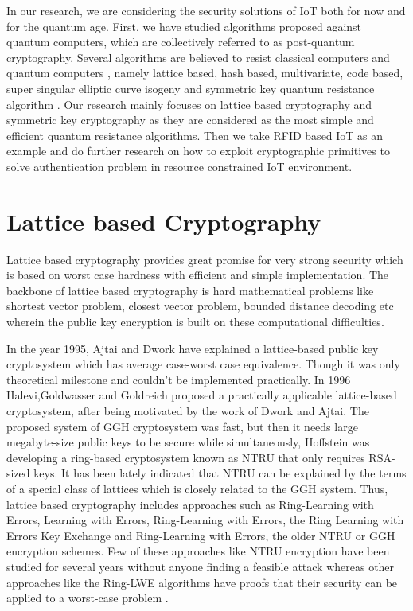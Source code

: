 \documentclass[preprint,10pt,5p]{elsarticle}
\begin{document}
In our research, we are considering the security solutions of IoT both for now and for the quantum age. First, we have studied algorithms proposed against quantum computers, which are collectively referred to as post-quantum cryptography. Several algorithms are believed to resist classical computers and quantum computers \cite{bernstein2009}, namely lattice based, hash based, multivariate, code based, super singular elliptic curve isogeny and symmetric key quantum resistance algorithm \cite{gabriel2013}. Our research mainly focuses on lattice based cryptography and symmetric key cryptography as they are considered as the most simple and efficient quantum resistance algorithms. Then we take RFID based IoT as an example and do further research on how to exploit cryptographic primitives to solve authentication problem in resource constrained IoT environment.

\section{Lattice based Cryptography}
\noindent Lattice based cryptography provides great promise for very strong security which is based on worst case hardness with efficient and simple implementation. The backbone of lattice based cryptography is hard mathematical problems like shortest vector problem, closest vector problem, bounded distance decoding etc wherein the public key encryption is built on these computational difficulties.

In the year 1995, Ajtai and Dwork have explained a lattice-based public key cryptosystem which has average case-worst case equivalence. Though it was only theoretical milestone and couldn’t be implemented practically. In 1996 Halevi,Goldwasser and Goldreich proposed a practically applicable lattice-based cryptosystem, after being motivated by the work of Dwork and Ajtai. The proposed system of GGH cryptosystem was fast, but then it needs large megabyte-size public keys to be secure while simultaneously, Hoffstein  was developing a ring-based cryptosystem known as NTRU that only requires RSA-sized keys. It has been lately indicated that NTRU can be explained by the terms of a special class of lattices which is closely related to the GGH system. Thus, lattice based cryptography includes approaches such as Ring-Learning with Errors, Learning with Errors, Ring-Learning with Errors, the Ring Learning with Errors Key Exchange and Ring-Learning with Errors, the older NTRU or GGH encryption schemes. Few of these approaches like NTRU encryption have been studied for several years without anyone finding a feasible attack whereas other approaches like the Ring-LWE algorithms have proofs that their security can be applied to a worst-case problem \cite{hoffstein2008introduction}.
\end{document}
